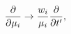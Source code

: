 \begin{equation}
\label{eq:Thder1}
{\partial\over\partial\mu_i}\rightarrow{w_i\over\mu_i}{\partial\over\partial t^\prime},
\end{equation}

